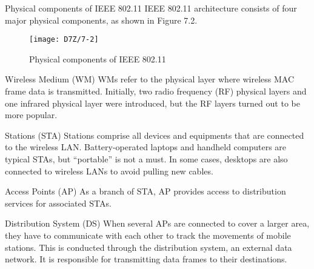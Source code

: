 \documentclass[a4paper,12pt]{book}
\begin{document}
\begin{term}{Physical components of IEEE 802.11}
    IEEE 802.11 architecture consists of four major physical components, as shown in Figure 7.2.

    \begin{figure}[!h]
        \centering
        \texttt{[image: D7Z/7-2]}
        \caption{Physical components of IEEE 802.11}
    \end{figure}

    \parskip 6pt
    \begin{secterm}{Wireless Medium (WM)}
        WMs refer to the physical layer where wireless MAC frame data is transmitted. Initially, two radio frequency (RF) physical layers and one infrared physical layer were introduced, but the RF layers turned out to be more popular.
    \end{secterm}

    \begin{secterm}{Stations (STA)}
        Stations comprise all devices and equipments that are connected to the wireless LAN. Battery-operated laptops and handheld computers are typical STAs, but “portable” is not a must. In some cases, desktops are also connected to wireless LANs to avoid pulling new cables.
    \end{secterm}

    \begin{secterm}{Access Points (AP)}
        As a branch of STA, AP provides access to distribution services for associated STAs.
    \end{secterm}

    \begin{secterm}{Distribution System (DS)}
        When several APs are connected to cover a larger area, they have to communicate with each other to track the movements of mobile stations. This is conducted through the distribution system, an external data network. It is responsible for transmitting data frames to their destinations.
    \end{secterm}
\end{term}
\end{document}
